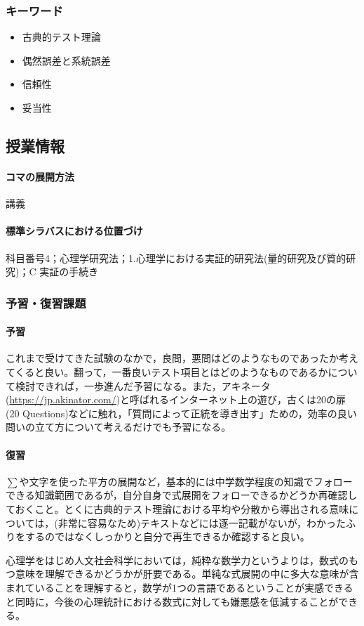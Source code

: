 \subsubsection{キーワード}
\begin{itemize}
	\item 古典的テスト理論
	\item 偶然誤差と系統誤差
	\item 信頼性
	\item 妥当性
\end{itemize}
\subsection{授業情報}
\paragraph{コマの展開方法}
講義
\paragraph{標準シラバスにおける位置づけ}
科目番号4；心理学研究法；1.心理学における実証的研究法(量的研究及び質的研究)；C 実証の手続き
\subsubsection{予習・復習課題}
\paragraph{予習}
これまで受けてきた試験のなかで，良問，悪問はどのようなものであったか考えてくると良い。翻って，一番良いテスト項目とはどのようなものであるかについて検討できれば，一歩進んだ予習になる。また，アキネータ(\url{https://jp.akinator.com/})と呼ばれるインターネット上の遊び，古くは20の扉(20 Questions)などに触れ，「質問によって正統を導き出す」ための，効率の良い問いの立て方について考えるだけでも予習になる。
\paragraph{復習}
$\sum$や文字を使った平方の展開など，基本的には中学数学程度の知識でフォローできる知識範囲であるが，自分自身で式展開をフォローできるかどうか再確認しておくこと。とくに古典的テスト理論における平均や分散から導出される意味については，(非常に容易なため)テキストなどには逐一記載がないが，わかったふりをするのではなくしっかりと自分で再生できるか確認すると良い。

心理学をはじめ人文社会科学においては，純粋な数学力というよりは，数式のもつ意味を理解できるかどうかが肝要である。単純な式展開の中に多大な意味が含まれていることを理解すると，数学が1つの言語であるということが実感できると同時に，今後の心理統計における数式に対しても嫌悪感を低減することができる。
